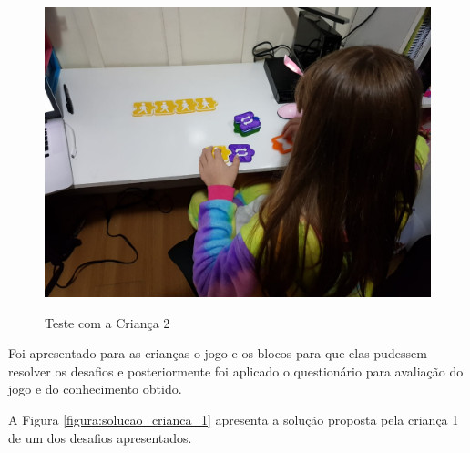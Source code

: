 \begin{figure}[H]
    \caption{Teste com a Criança 2}
    \centering
    \includegraphics[width=\linewidth]{Imagens/Cap5/Teste_crianca_2.jpeg}
    \label{figura:teste_crianca_2}
\end{figure}

Foi apresentado para as crianças o jogo e os blocos para que elas pudessem resolver os desafios e posteriormente foi aplicado o questionário para avaliação do jogo e do conhecimento obtido.

A Figura \ref{figura:solucao_crianca_1} apresenta a solução proposta pela criança 1 de um dos desafios apresentados.

